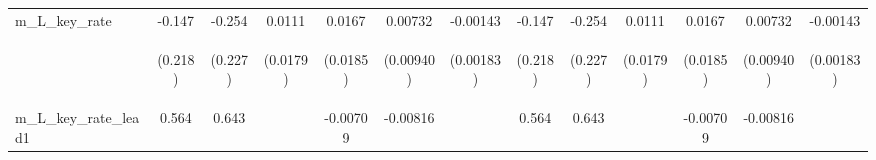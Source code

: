 \documentclass[]{article}
\begin{document}
\begin{center}
\begin{tabular}{lcccccccccccc}
m\_L\_key\_rate & -0.147 & -0.254 & 0.0111 & 0.0167 & 0.00732 & -0.00143 & -0.147 & -0.254 & 0.0111 & 0.0167 & 0.00732 & -0.00143 \\
\vspace{4pt} & \begin{footnotesize}(0.218)\end{footnotesize} & \begin{footnotesize}(0.227)\end{footnotesize} & \begin{footnotesize}(0.0179)\end{footnotesize} & \begin{footnotesize}(0.0185)\end{footnotesize} & \begin{footnotesize}(0.00940)\end{footnotesize} & \begin{footnotesize}(0.00183)\end{footnotesize} & \begin{footnotesize}(0.218)\end{footnotesize} & \begin{footnotesize}(0.227)\end{footnotesize} & \begin{footnotesize}(0.0179)\end{footnotesize} & \begin{footnotesize}(0.0185)\end{footnotesize} & \begin{footnotesize}(0.00940)\end{footnotesize} & \begin{footnotesize}(0.00183)\end{footnotesize} \\
m\_L\_key\_rate\_lead1 & 0.564 & 0.643 &  & -0.00709 & -0.00816 &  & 0.564 & 0.643 &  & -0.00709 & -0.00816 &  \\

\end{tabular}
\end{center}
\end{document}
